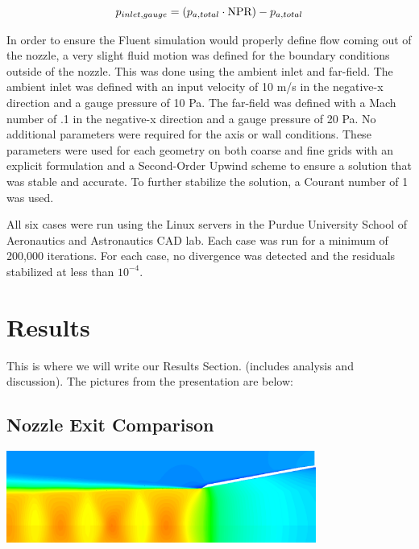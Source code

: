 \documentclass[12pt]{article} %
\begin{document}
\begin{equation}\label{eq:inletpressure}
    p_{inlet,gauge}=\left(p_{a,total}\cdot \textnormal{NPR}\right)-p_{a,total}
\end{equation}

In order to ensure the Fluent simulation would properly define flow coming out of the nozzle, a very slight fluid motion was defined for the boundary conditions outside of the nozzle. This was done using the ambient inlet and far-field. The ambient inlet was defined with an input velocity of 10 m/s in the negative-x direction and a gauge pressure of 10 Pa. The far-field was defined with a Mach number of .1 in the negative-x direction and a gauge pressure of 20 Pa. No additional parameters were required for the axis or wall conditions. These parameters were used for each geometry on both coarse and fine grids with an explicit formulation and a Second-Order Upwind scheme to ensure a solution that was stable and accurate. To further stabilize the solution, a Courant number of 1 was used.\par

All six cases were run using the Linux servers in the Purdue University School of Aeronautics and Astronautics CAD lab. Each case was run for a minimum of 200,000 iterations. For each case, no divergence was detected and the residuals stabilized at less than $10^{-4}$.

\clearpage
\section{Results}
This is where we will write our Results Section.  (includes analysis and discussion). The pictures from the presentation are below:

\subsection{Nozzle Exit Comparison}
\begin{center}
    \includegraphics[width=4in]{Mach_A.png}
    \label{fig:mach_A}
\end{center}
\end{document}
